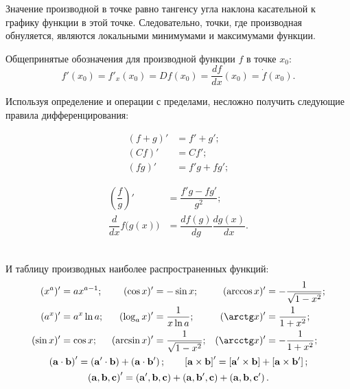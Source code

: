 Значение производной в точке равно тангенсу угла наклона касательной к графику функции в этой точке. Следовательно, точки, где производная обнуляется, являются локальными минимумами и максимумами функции.

Общепринятые обозначения для производной функции $f$ в точке $x_0$:
\begin{equation}
	f'(x_0) = f'_x(x_0) = D f(x_0) = \frac{d f}{d x}(x_0) = \dot{f} (x_0).
\end{equation}

Используя определение и операции с пределами, несложно получить следующие правила дифференцирования:\\[-0.5pc]
\begin{minipage}{0.5\textwidth}
	\begin{align*}
		(f+g)' &= f' + g';\\
		(Cf)' &= Cf';\\
		(fg)' &= f' g + f g';
	\end{align*}
\end{minipage}
\begin{minipage}{0.5\textwidth}
	\begin{align*}
		\left(\dfrac{f}{g}\right)' &= \dfrac{f' g - f g'}{g^2};\\
		\dfrac{d}{dx}f\bigl(g(x)\bigr) &= \dfrac{df(g)}{dg}\dfrac{dg(x)}{dx}.
	\end{align*}
\end{minipage}\\[0.5pc]
И таблицу производных наиболее распространенных функций:
\begin{gather*}
    \begin{aligned}
	   (x^a)' &= a x^{a-1};
	   & (\cos x)' &= - \sin x;
	   & (\arccos x)' &= - \dfrac{1}{\sqrt{1 - x^2}};\\
	   (a^x)' &= a^x \ln a;
	   & (\log_a x)' &= \dfrac{1}{x \ln a};
	   & (\arctg x)' &= \dfrac{1}{1 + x^2};\\
	   (\sin x)' &= \cos x;
	   & (\arcsin x)' &= \dfrac{1}{\sqrt{1 - x^2}};
	   &  (\arcctg x)' &= - \dfrac{1}{1 + x^2};\\
    \end{aligned}\\
    \scalar{a}{b}' = \scalar{a'}{b} + \scalar{a}{b'};\qquad
	\cross{a}{b}' = \cross{a'}{b} + \cross{a}{b'}; \\
	\triple{a}{b}{c}' = \triple{a'}{b}{c} + \triple{a}{b'}{c} + \triple{a}{b}{c'}.
\end{gather*}
